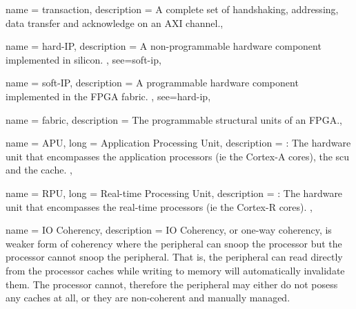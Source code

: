 {
	name = {transaction},
	description = {A complete set of handshaking, addressing, data transfer and acknowledge on
	an AXI channel.},
}


{
	name = {hard-IP},
	description = {
		A non-programmable hardware component implemented in silicon.
	},
	see={soft-ip},
}

{
	name = {soft-IP},
	description = {
		A programmable hardware component implemented in the FPGA \gls{fabric}.
	},
	see={hard-ip},
}

{
	name = {fabric},
	description = {The programmable structural units of an FPGA.},
}

{
	name = {APU},
	long = {Application Processing Unit},
	description = {\emph{}:
		The hardware unit that encompasses the application processors (ie the Cortex-A cores),
		the \gls{scu} and the cache.
	},
}

{
	name = {RPU},
	long = {Real-time Processing Unit},
	description = {\emph{}:
		The hardware unit that encompasses the real-time processors (ie the Cortex-R cores).
	},
}


{
	name = {IO Coherency},
	description = {
		IO Coherency, or one-way coherency, is weaker form of coherency where
		the peripheral can snoop the processor but the processor cannot snoop the peripheral.
		That is, the peripheral can read directly from the processor caches while
		writing to memory will automatically invalidate them. The processor cannot,
		therefore the peripheral may either do not posess any caches at all, or they
		are non-coherent and manually managed.
	}
}

